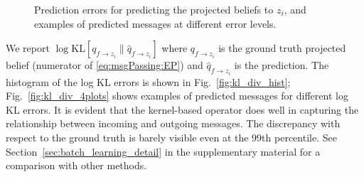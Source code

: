 \documentclass[english]{article}
\theoremstyle{plain}
\theoremstyle{plain}
\newcommand{\factor}{f}				%
\newcommand{\aenote}[1]{}
\newcommand{\figref}[1]{Fig.~\ref{#1}}
\newcommand{\secref}[1]{Section~\ref{#1}}
\begin{document}
\begin{figure}[ht]
  \centering

  \caption{Prediction errors for predicting the projected beliefs to $z_i$, and examples of predicted messages at different error levels. 
  }
  \label{fig:kl_div}
\end{figure}


We report 
$\log \mathrm{KL}[q_{\factor \rightarrow z_i} \| \hat{q}_{\factor \rightarrow z_i}]$ 
where $q_{\factor \rightarrow z_i}$ is the ground truth projected belief (numerator of  \eqref{eq:msgPassing:EP}) and 
$\hat{q}_{\factor \rightarrow z_i}$ is the prediction.
The histogram of the log KL errors is shown in \figref{fig:kl_div_hist}; \figref{fig:kl_div_4plots} shows examples of predicted messages 
for different log KL errors. 
It is evident that the kernel-based operator does well in capturing the relationship
between incoming and outgoing messages. The discrepancy with respect to the ground truth is barely 
visible even at the 99th percentile. 
See \secref{sec:batch_learning_detail} in
the supplementary material for a comparison with other methods.
\end{document}
